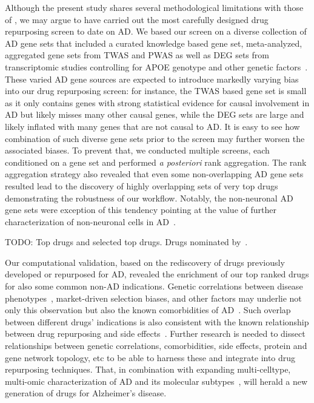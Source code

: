 \documentclass[letterpaper]{article}
\begin{document}
Although the present study shares several methodological limitations with
those of \cite{Fang2021,Taubes2021}, we may argue to have carried out the most
carefully designed drug repurposing screen to date on AD.  We based our screen
on a diverse collection of AD gene sets that included a curated knowledge
based gene set, meta-analyzed, aggregated gene sets from TWAS and PWAS as well
as DEG sets from transcriptomic studies controlling for APOE genotype and
other genetic factors~\citep{Lin2018}.  These varied AD gene sources are
expected to introduce markedly varying bias into our drug repurposing screen: for
instance, the TWAS based gene set is small as it only contains genes with
strong statistical evidence for causal involvement in AD but likely misses
many other causal genes, while the DEG sets are large and likely inflated with
many genes that are not causal to AD.  It is easy to see how combination of
such diverse gene sets prior to the screen may further worsen the associated
biases. To prevent that, we conducted multiple screens, each conditioned on a
gene set and performed \emph{a posteriori} rank aggregation.  The rank
aggregation strategy also revealed that even some non-overlapping AD gene sets
resulted lead to the discovery of highly overlapping sets of very top drugs
demonstrating the robustness of our workflow.  Notably, the non-neuronal
AD gene sets were exception of this tendency pointing at the value of further
characterization of non-neuronal cells in
AD~\citep{Lopes2022,Mathys2019,DeStrooper2016}.

TODO: Top drugs and selected top drugs.  Drugs nominated
by~\cite{Fang2021,Taubes2021}.

Our computational validation, based on the rediscovery of drugs previously
developed or repurposed for AD, revealed the enrichment of our top ranked
drugs for also some common non-AD indications.  Genetic correlations between
disease phenotypes~\citep{Consortium2018}, market-driven selection biases, and
other factors may underlie not only this observation but also the known
comorbidities of AD~\citep{Santiago2021}.  Such overlap between different
drugs' indications is also consistent with the known relationship between drug
repurposing and side effects~\citep{Ye2014}.  Further research is needed to
dissect relationships between genetic correlations, comorbidities, side
effects, protein and gene network topology, etc to be able to harness these and
integrate into drug repurposing techniques.  That, in combination with
expanding multi-celltype, multi-omic characterization of AD and its molecular
subtypes~\citep{Neff2021}, will herald a new generation of drugs for
Alzheimer's disease.
\end{document}
